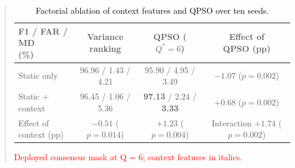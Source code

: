 \documentclass[11pt]{article}
\newenvironment{excerpt}{\begin{quote}\sloppy}{\end{quote}}
\begin{document}
\begin{excerpt}
\setcounter{table}{9}
\begin{table}[H]
\centering
\scriptsize
\caption{\textcolor{black}{Factorial ablation of context features and QPSO over ten seeds.}}

\color{black}
\setlength{\tabcolsep}{3pt}
\begin{adjustbox}{max width=\linewidth}
\begin{tabular}{lccc}
\hline\toprule
\makecell[l]{F1 / FAR / MD\\(\%)} & \makecell{Variance\\ranking} & \makecell{QPSO\\($Q^{*}{=}6$)} & \makecell{Effect of\\QPSO (pp)} \\
\hline\toprule
Static only & 96.96 / 1.43 / 4.21 & 95.90 / 4.95 / 3.49 & \makecell{$-1.07$\\($p{=}0.002$)} \\
\makecell[l]{Static +\\context} & 96.45 / 1.06 / 5.36 & \textbf{97.13} / 2.24 / \textbf{3.33} & \makecell{$+0.68$\\($p{=}0.002$)} \\
\midrule
\makecell[l]{Effect of\\context (pp)} & \makecell{$-0.51$\\($p{=}0.014$)} & \makecell{$+1.23$\\($p{=}0.004$)} & \makecell{Interaction\\$+1.74$\\($p{=}0.002$)} \\
\hline\toprule
\end{tabular}
\end{adjustbox}
\end{table}

\setcounter{table}{10}
\begin{table}[H]
\centering
\scriptsize
\caption{\textcolor{red}{Deployed consensus mask at Q = 6; context features in italics.}}


\end{table}
\end{excerpt}
\end{document}
